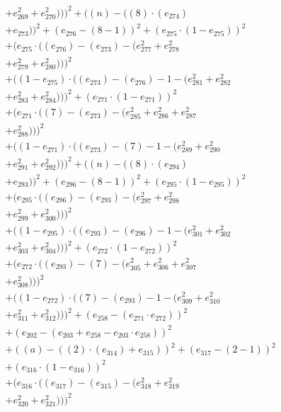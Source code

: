\documentclass[10pt, a4paper]{article}
\begin{document}
\begin{align*}
& + e_{269}^{2} + e_{270}^{2})))^{2} + ((n) - ((8)  \cdot  (e_{274}) \\
& + e_{273}))^{2} + (e_{276} - (8 - 1))^{2} + (e_{275}  \cdot  (1 - e_{275}))^{2} \\
& + (e_{275}  \cdot  ((e_{276}) - (e_{273}) - (e_{277}^{2} + e_{278}^{2} \\
& + e_{279}^{2} + e_{280}^{2})))^{2} \\
& + ((1 - e_{275})  \cdot  ((e_{273}) - (e_{276}) - 1 - (e_{281}^{2} + e_{282}^{2} \\
& + e_{283}^{2} + e_{284}^{2})))^{2} + (e_{271}  \cdot  (1 - e_{271}))^{2} \\
& + (e_{271}  \cdot  ((7) - (e_{273}) - (e_{285}^{2} + e_{286}^{2} + e_{287}^{2} \\
& + e_{288}^{2})))^{2} \\
& + ((1 - e_{271})  \cdot  ((e_{273}) - (7) - 1 - (e_{289}^{2} + e_{290}^{2} \\
& + e_{291}^{2} + e_{292}^{2})))^{2} + ((n) - ((8)  \cdot  (e_{294}) \\
& + e_{293}))^{2} + (e_{296} - (8 - 1))^{2} + (e_{295}  \cdot  (1 - e_{295}))^{2} \\
& + (e_{295}  \cdot  ((e_{296}) - (e_{293}) - (e_{297}^{2} + e_{298}^{2} \\
& + e_{299}^{2} + e_{300}^{2})))^{2} \\
& + ((1 - e_{295})  \cdot  ((e_{293}) - (e_{296}) - 1 - (e_{301}^{2} + e_{302}^{2} \\
& + e_{303}^{2} + e_{304}^{2})))^{2} + (e_{272}  \cdot  (1 - e_{272}))^{2} \\
& + (e_{272}  \cdot  ((e_{293}) - (7) - (e_{305}^{2} + e_{306}^{2} + e_{307}^{2} \\
& + e_{308}^{2})))^{2} \\
& + ((1 - e_{272})  \cdot  ((7) - (e_{293}) - 1 - (e_{309}^{2} + e_{310}^{2} \\
& + e_{311}^{2} + e_{312}^{2})))^{2} + (e_{258} - (e_{271}  \cdot  e_{272}))^{2} \\
& + (e_{202} - (e_{203} + e_{258} - e_{203}  \cdot  e_{258}))^{2} \\
& + ((a) - ((2)  \cdot  (e_{314}) + e_{315}))^{2} + (e_{317} - (2 - 1))^{2} \\
& + (e_{316}  \cdot  (1 - e_{316}))^{2} \\
& + (e_{316}  \cdot  ((e_{317}) - (e_{315}) - (e_{318}^{2} + e_{319}^{2} \\
& + e_{320}^{2} + e_{321}^{2})))^{2} \\

\end{align*}
\end{document}
